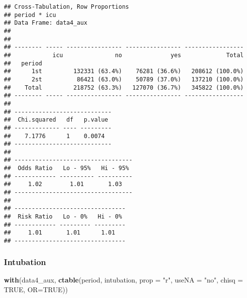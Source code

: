 \documentclass[
]{article}
\newenvironment{Shaded}{\begin{snugshade}}{\end{snugshade}}
\newcommand{\DataTypeTok}[1]{\textcolor[rgb]{0.13,0.29,0.53}{#1}}
\newcommand{\KeywordTok}[1]{\textcolor[rgb]{0.13,0.29,0.53}{\textbf{#1}}}
\newcommand{\NormalTok}[1]{#1}
\newcommand{\OtherTok}[1]{\textcolor[rgb]{0.56,0.35,0.01}{#1}}
\newcommand{\StringTok}[1]{\textcolor[rgb]{0.31,0.60,0.02}{#1}}
\begin{document}
\begin{verbatim}
## Cross-Tabulation, Row Proportions  
## period * icu  
## Data Frame: data4_aux  
## 
## 
## -------- ----- ---------------- ---------------- -----------------
##            icu               no              yes             Total
##   period                                                          
##      1st         132331 (63.4%)    76281 (36.6%)   208612 (100.0%)
##      2st          86421 (63.0%)    50789 (37.0%)   137210 (100.0%)
##    Total         218752 (63.3%)   127070 (36.7%)   345822 (100.0%)
## -------- ----- ---------------- ---------------- -----------------
## 
## ----------------------------
##  Chi.squared   df   p.value 
## ------------- ---- ---------
##    7.1776      1    0.0074  
## ----------------------------
## 
## ----------------------------------
##  Odds Ratio   Lo - 95%   Hi - 95% 
## ------------ ---------- ----------
##     1.02        1.01       1.03   
## ----------------------------------
## 
## --------------------------------
##  Risk Ratio   Lo - 0%   Hi - 0% 
## ------------ --------- ---------
##     1.01       1.01      1.01   
## --------------------------------
\end{verbatim}

\hypertarget{intubation}{%
\subsubsection{Intubation}\label{intubation}}

\begin{Shaded}
\begin{Highlighting}[]
\KeywordTok{with}\NormalTok{(data4_aux, }\KeywordTok{ctable}\NormalTok{(period, intubation, }\DataTypeTok{prop =} \StringTok{"r"}\NormalTok{, }\DataTypeTok{useNA =} \StringTok{"no"}\NormalTok{, }\DataTypeTok{chisq =} \OtherTok{TRUE}\NormalTok{, }\DataTypeTok{OR=}\OtherTok{TRUE}\NormalTok{))}
\end{Highlighting}
\end{Shaded}
\end{document}
